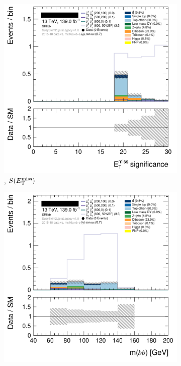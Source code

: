 \begin{figure}[tp]
\centering
\begin{subfigure}{0.495\textwidth}
\centering
\includegraphics[width=\textwidth]{figures/2ljets_def_met_Sign_SRllbb.png}
\caption{\srllbb, $S(E_\mathrm{T}^\mathrm{miss})$}
\end{subfigure}
\hfill
\begin{subfigure}{0.495\textwidth}
\centering
\includegraphics[width=\textwidth]{figures/2ljets_def_mbb_SRllbb.png}

\end{subfigure}
\end{figure}
